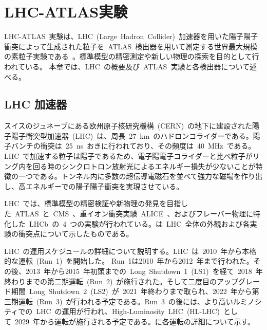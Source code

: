 \chapter{LHC-ATLAS実験}
\thispagestyle{empty}
\label{chap:2}
LHC-ATLAS~実験は、LHC~(Large~Hadron~Collider)~加速器を用いた陽子陽子衝突によって生成された粒子を~ATLAS~検出器を用いて測定する世界最大規模の素粒子実験である~\cite{TR:01}。標準模型の精密測定や新しい物理の探索を目的として行われている。
本章では、LHC~の概要及び~ATLAS~実験と各検出器について述べる。

\section{LHC 加速器}
スイスのジュネーブにある欧州原子核研究機構~(CERN)~の地下に建設された陽子陽子衝突型加速器~(LHC)~は、周長~27~km~のハドロンコライダーである。陽子バンチの衝突は~25~ns~おきに行われており、その頻度は~40~MHz~である。LHC~で加速する粒子は陽子であるため、電子陽電子コライダーと比べ粒子がリング内を回る時のシンクロトロン放射光によるエネルギー損失が少ないことが特徴の一つである。トンネル内に多数の超伝導電磁石を並べて強力な磁場を作り出し、高エネルギーでの陽子陽子衝突を実現させている。

LHC~では、標準模型の精密検証や新物理の発見を目指した~ATLAS~\cite{URL:13}と~CMS~\cite{URL:14}、重イオン衝突実験~ALICE~\cite{URL:15}、およびフレーバー物理に特化した~LHCb~\cite{URL:16}の~4~つの実験が行われている。は~LHC~全体の外観および各実験の衝突点について示したものである。

LHC~の運用スケジュールの詳細について説明する。LHC~は~2010~年から本格的な運転~(Run~1)~を開始した。
Run~1は2010~年から2012~年まで行われた。その後、2013~年から2015~年初頭までの~Long~Shutdown~1~(LS1)~を経て~2018~年終わりまでの第二期運転~(Run~2)~が施行された。そして二度目のアップグレード期間~Long~Shutdown~2~(LS2)~が~2021~年終わりまで取られ、2022~年から第三期運転~(Run~3)~が行われる予定である。Run~3~の後には、より高いルミノシティでの~LHC~の運用が行われ、High-Luminosity~LHC~(HL-LHC)~として~2029~年から運転が施行される予定である。に各運転の詳細について示す。

